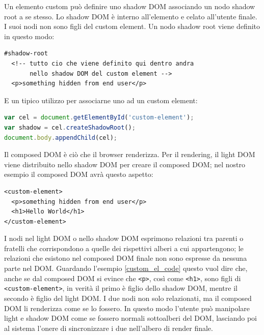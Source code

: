 Un elemento custom può definire uno shadow DOM associando un nodo shadow root a se stesso. Lo shadow DOM è interno all’elemento e celato all’utente finale. I suoi nodi non sono figli del custom element. Un nodo shadow root viene definito in questo modo:
\begin{lstlisting}[language=HTML5]
#shadow-root
  <!-- tutto cio che viene definito qui dentro andra
  	   nello shadow DOM del custom element -->
  <p>something hidden from end user</p>
\end{lstlisting}
E un tipico utilizzo per associarne uno ad un custom element:
\begin{lstlisting}[language=JavaScript]
var cel = document.getElementById('custom-element');
var shadow = cel.createShadowRoot();
document.body.appendChild(cel);
\end{lstlisting}
Il composed DOM è ciò che il browser renderizza. Per il rendering, il light DOM viene distribuito nello shadow DOM per creare il composed DOM; nel nostro esempio il composed DOM avrà questo aspetto:
\begin{lstlisting}[language=HTML5,label={custom_el_code}]
<custom-element>
  <p>something hidden from end user</p>
  <h1>Hello World</h1>
</custom-element>
\end{lstlisting}
I nodi nel light DOM o nello shadow DOM esprimono relazioni tra parenti o fratelli che corrispondono a quelle dei rispettivi alberi a cui appartengono; le relazioni che esistono nel composed DOM finale non sono espresse da nessuna parte nel DOM. Guardando l’esempio \ref{custom_el_code} questo vuol dire che, anche se dal composed DOM si evince che \texttt{<p>}, così come \texttt{<h1>}, sono figli di \texttt{<custom-element>}, in verità il primo è figlio dello shadow DOM, mentre il secondo è figlio del light DOM. I due nodi non solo relazionati, ma il composed DOM li renderizza come se lo fossero. In questo modo l’utente può manipolare light e shadow DOM come se fossero normali sottoalberi del DOM, lasciando poi al sistema l’onere di sincronizzare i due nell’albero di render finale.

